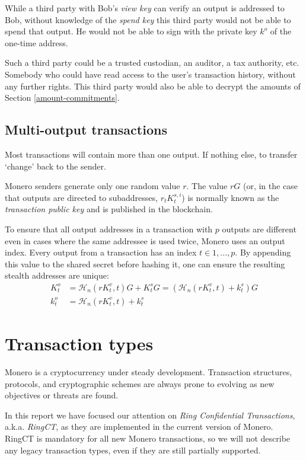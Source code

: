 While a third party with Bob’s {\em view key} can verify an output is addressed to Bob, without knowledge of the {\em spend key} this third party would not be able to spend that output. He would not be able to sign with the private key $k^o$ of the one-time address.

Such a third party could be a trusted custodian, an auditor, a tax authority, etc. Somebody who could have read access to the user’s transaction history, without any further rights. This third party would also be able to decrypt the amounts of Section \ref{amount-commitments}.
\\


\subsection{Multi-output transactions}
\label{sec:multi_out_transactions}

Most transactions will contain more than one output. If nothing else, to transfer `change’ back to the sender.

Monero senders generate only one random value $r$. The value $r G$ (or, in the case that outputs are directed to subaddresses, $r_t K_t^{s,i}$) is normally known as the {\em transaction public key} and is published in the blockchain.

To ensure that all output addresses in a transaction with $p$ outputs are different even in cases where the same addressee is used twice, Monero uses an output index. Every output from a transaction has an index $t \in {1, ..., p}$. By appending this value to the shared secret before hashing it, one can ensure the resulting stealth addresses are unique:\\
\begin{align*}
  K_t^o &= \mathcal{H}_n(r K_t^v, t)G + K_t^s G = (\mathcal{H}_n(r K_t^v, t) + k_t^s)G  \\ 
  k_t^o &= \mathcal{H}_n(r K_t^v, t) + k_t^s
\end{align*} 


\newpage
\section{Transaction types}
\label{sec:transaction_types}

Monero is a cryptocurrency under steady development. Transaction structures, protocols, and cryptographic schemes are always prone to evolving as new objectives or threats are found.

In this report we have focused our attention on {\em Ring Confidential Transactions}, a.k.a. {\em RingCT}, as they are implemented in the current version of Monero. RingCT is mandatory for all new Monero transactions, so we will not describe any legacy transaction types, even if they are still partially supported.
\\

